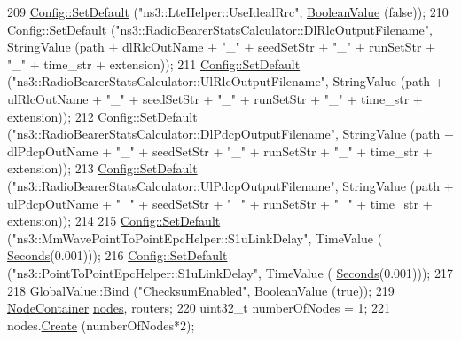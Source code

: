 \begin{DoxyCode}
{{{209   \hyperlink{group__config_ga2e7882df849d8ba4aaad31c934c40c06}{Config::SetDefault} (\textcolor{stringliteral}{"ns3::LteHelper::UseIdealRrc"}, 
      \hyperlink{classns3_1_1BooleanValue}{BooleanValue} (\textcolor{keyword}{false}));
210   \hyperlink{group__config_ga2e7882df849d8ba4aaad31c934c40c06}{Config::SetDefault} (\textcolor{stringliteral}{"ns3::RadioBearerStatsCalculator::DlRlcOutputFilename"}, StringValue
              (path + dlRlcOutName   + \textcolor{stringliteral}{"\_"} + seedSetStr + \textcolor{stringliteral}{"\_"} + runSetStr + \textcolor{stringliteral}{"\_"} + time\_str + extension));
211   \hyperlink{group__config_ga2e7882df849d8ba4aaad31c934c40c06}{Config::SetDefault} (\textcolor{stringliteral}{"ns3::RadioBearerStatsCalculator::UlRlcOutputFilename"}, StringValue
              (path + ulRlcOutName   + \textcolor{stringliteral}{"\_"} + seedSetStr + \textcolor{stringliteral}{"\_"} + runSetStr + \textcolor{stringliteral}{"\_"} + time\_str + extension));
212   \hyperlink{group__config_ga2e7882df849d8ba4aaad31c934c40c06}{Config::SetDefault} (\textcolor{stringliteral}{"ns3::RadioBearerStatsCalculator::DlPdcpOutputFilename"}, 
      StringValue       (path + dlPdcpOutName + \textcolor{stringliteral}{"\_"} + seedSetStr + \textcolor{stringliteral}{"\_"} + runSetStr + \textcolor{stringliteral}{"\_"} + time\_str + extension));
213   \hyperlink{group__config_ga2e7882df849d8ba4aaad31c934c40c06}{Config::SetDefault} (\textcolor{stringliteral}{"ns3::RadioBearerStatsCalculator::UlPdcpOutputFilename"}, 
      StringValue       (path + ulPdcpOutName + \textcolor{stringliteral}{"\_"} + seedSetStr + \textcolor{stringliteral}{"\_"} + runSetStr + \textcolor{stringliteral}{"\_"} + time\_str + extension));
214 
215   \hyperlink{group__config_ga2e7882df849d8ba4aaad31c934c40c06}{Config::SetDefault} (\textcolor{stringliteral}{"ns3::MmWavePointToPointEpcHelper::S1uLinkDelay"}, TimeValue (
      \hyperlink{group__timecivil_ga33c34b816f8ff6628e33d5c8e9713b9e}{Seconds}(0.001)));
216   \hyperlink{group__config_ga2e7882df849d8ba4aaad31c934c40c06}{Config::SetDefault} (\textcolor{stringliteral}{"ns3::PointToPointEpcHelper::S1uLinkDelay"}, TimeValue (
      \hyperlink{group__timecivil_ga33c34b816f8ff6628e33d5c8e9713b9e}{Seconds}(0.001)));
217 
218   GlobalValue::Bind (\textcolor{stringliteral}{"ChecksumEnabled"}, \hyperlink{classns3_1_1BooleanValue}{BooleanValue} (\textcolor{keyword}{true}));
219   \hyperlink{classns3_1_1NodeContainer}{NodeContainer} \hyperlink{visualizer-ideas_8txt_a3e1b3808014a2c68ab0cd0182e041be2}{nodes}, routers;
220   uint32\_t numberOfNodes = 1;
221   nodes.\hyperlink{classns3_1_1NodeContainer_a787f059e2813e8b951cc6914d11dfe69}{Create} (numberOfNodes*2);
}}}
\end{DoxyCode}
